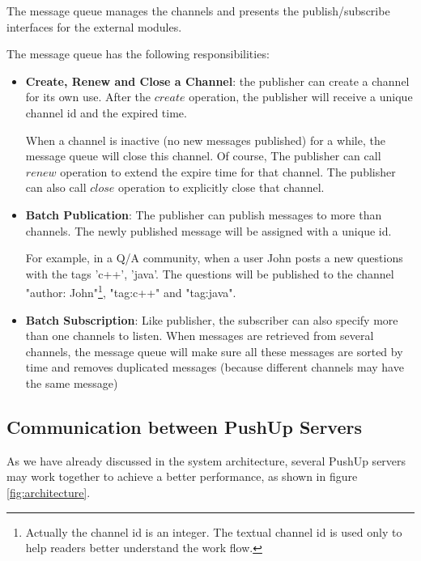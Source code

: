 The message queue manages the channels and presents the publish/subscribe 
interfaces for the external modules.

The message queue has the following responsibilities:
\begin{itemize}
    \item {\bf Create, Renew and Close a Channel}: the publisher can create
            a channel for its own use. After the $create$ 
            operation, the publisher will receive a unique channel id and the
            expired time.

            When a channel is inactive (no new messages published) for a 
            while, the message queue will close this channel. Of course, The publisher
            can call $renew$ operation to extend the expire time for that channel.
            The publisher can also call $close$ operation to explicitly
            close that channel.
    \item {\bf Batch Publication}: The publisher can publish messages to more than 
            channels. The newly published message will be assigned with a 
            unique id.
            
            For example, in a Q/A community, when a user John posts a new 
            questions with the tags 'c++', 'java'. The questions will be 
            published to the channel "author: John"\footnote{Actually the channel 
            id is an integer. The textual channel id is used only to help readers
            better understand the work flow.}, "tag:c++" and "tag:java".

    \item {\bf Batch Subscription}: Like publisher, the subscriber can also specify
            more than one channels to listen. When messages are retrieved from
            several channels, the message queue will make sure all these messages 
            are sorted by time and removes duplicated messages (because different 
            channels may have the same message)
\end{itemize}

\subsection{Communication between PushUp Servers\\}

As we have already discussed in the system architecture, several PushUp 
servers may work together to achieve a better performance, as shown in 
figure \ref{fig:architecture}.

